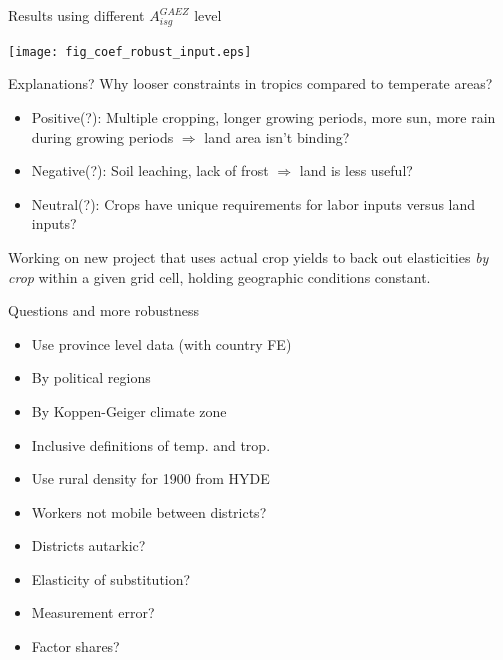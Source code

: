 \documentclass[10pt, xcolor=dvipsnames]{beamer}
\begin{document}
\begin{frame}{Results using different $A^{GAEZ}_{isg}$ level}\label{prod}
\begin{center}
\texttt{[image: fig\_coef\_robust\_input.eps]}
\end{center}
\hfill \hyperlink{prodreg}{}
\end{frame}

\begin{frame}{Explanations?}
Why looser constraints in tropics compared to temperate areas?
\begin{itemize}
  \item Positive(?): Multiple cropping, longer growing periods, more sun, more rain during growing periods $\Rightarrow$ land area isn't binding?
  \item Negative(?): Soil leaching, lack of frost $\Rightarrow$ land is less useful?
  \item Neutral(?): Crops have unique requirements for labor inputs versus land inputs?
\end{itemize}

\vspace{.2cm} Working on new project that uses actual crop yields to back out elasticities \textit{by crop} within a given grid cell, holding geographic conditions constant.
\end{frame}

\begin{frame}{Questions and more robustness}\label{robustness}
\begin{itemize}
  \item Use province level data (with country FE) \hyperlink{regprov}{}
  \item By political regions \hyperlink{subregiontab}{}
  \item By Koppen-Geiger climate zone \hyperlink{climatereg}{}
  \item Inclusive definitions of temp. and trop. \hyperlink{definition}{}
  \item Use rural density for 1900 from HYDE \hyperlink{reg1900}{}
  \item Workers not mobile between districts? \hyperlink{nonmobile}{}
  \item Districts autarkic? \hyperlink{autarky}{}  
  \item Elasticity of substitution? \hyperlink{eos}{}
  \item Measurement error? \hyperlink{measure}{}
  \item Factor shares? \hyperlink{shares}{}
\end{itemize}
\end{frame}
\end{document}
